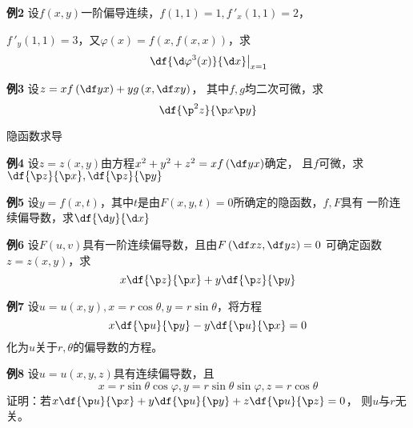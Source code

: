 \begin{frame}
	\linespread{1.2}
	\begin{exampleblock}{{\bf 例2}\hfill}
		设$f(x,y)$一阶偏导连续，$f(1,1)=1,f\,'_x(1,1)=2$，
		
		$f\,'_y(1,1)=3$，又$\varphi(x)=f(x,f(x,x))$，求
		$$\left.\df{\d\varphi^3(x)}{\d x}\right|_{x=1}$$
	\end{exampleblock}
\end{frame}

\begin{frame}
	\linespread{1.2}
	\begin{exampleblock}{{\bf 例3}\hfill}
		设$z=xf\left(\df yx\right)+yg\left(x,\df xy\right)$，
		其中$f,g$均二次可微，求
		$$\df{\p^2 z}{\p x\p y}$$
	\end{exampleblock}
\end{frame}

\begin{frame}{隐函数求导}
	\linespread{1.2}
	\begin{exampleblock}{{\bf 例4}\hfill}
		设$z=z(x,y)$由方程$x^2+y^2+z^2=xf\left(\df yx\right)$确定，
		且$f$可微，求$\df {\p z}{\p x},\df{\p z}{\p y}$
	\end{exampleblock}\pause 
	\begin{exampleblock}{{\bf 例5}\hfill}
		设$y=f(x,t)$，其中$t$是由$F(x,y,t)=0$所确定的隐函数，$f,F$具有
		一阶连续偏导数，求$\df{\d y}{\d x}$
	\end{exampleblock}
\end{frame}

\begin{frame}
	\linespread{1.2}
	\begin{exampleblock}{{\bf 例6}\hfill}
		设$F(u,v)$具有一阶连续偏导数，且由$F\left(\df xz,\df yz\right)=0$
		可确定函数$z=z(x,y)$，求
		$$x\df{\p z}{\p x}+y\df{\p z}{\p y}$$
	\end{exampleblock}
\end{frame}

\begin{frame}
	\linespread{1.2}
	\begin{exampleblock}{{\bf 例7}\hfill}
		设$u=u(x,y),x=r\cos\theta,y=r\sin\theta$，将方程
		$$x\df{\p u}{\p y}-y\df{\p u}{\p x}=0$$
		化为$u$关于$r,\theta$的偏导数的方程。
	\end{exampleblock}
\end{frame}

\begin{frame}
	\linespread{1.2}
	\begin{exampleblock}{{\bf 例8}\hfill}
		设$u=u(x,y,z)$具有连续偏导数，且
		$$x=r\sin\theta\cos\varphi,y=r\sin\theta\sin\varphi,z=r\cos\theta$$
		证明：若$x\df{\p u}{\p x}+y\df{\p u}{\p y}+z\df{\p u}{\p z}=0$，
		则$u$与$r$无关。
	\end{exampleblock}
\end{frame}

